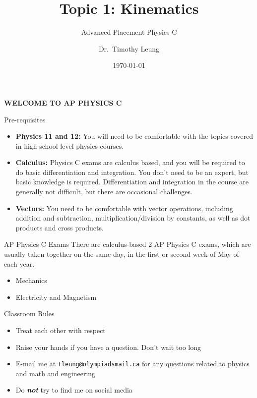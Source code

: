 \documentclass[12pt,compress,aspectratio=169]{beamer}
\title{Topic 1: Kinematics}
\subtitle{Advanced Placement Physics C}
\author[TML]{Dr.\ Timothy Leung}
\institute{Olympiads School}
\date{\today}
\begin{document}
\begin{frame}{}

  {\LARGE
    \begin{center}
      \textbf{WELCOME TO AP PHYSICS C}
    \end{center}
  }
\end{frame}



\begin{frame}{Pre-requisites}
  \begin{itemize}
  \item\textbf{Physics 11 and 12:} You will need to be comfortable with the
    topics covered in high-school level physics courses.
  \item\textbf{Calculus:} Physics C exams are calculus based, and you will be
    required to do basic differentiation and integration. You don't need to be
    an expert, but basic knowledge is required. Differentiation and integration
    in the course are generally not difficult, but there are occasional
    challenges.
  \item\textbf{Vectors:} You need to be comfortable with vector operations,
    including addition and subtraction, multiplication/division by constants,
    as well as dot products and cross products.
  \end{itemize}
\end{frame}



\begin{frame}{AP Physics C Exams}
  There are calculus-based 2 AP Physics C exams, which are usually taken
  together on the same day, in the first or second week of May of each year.
  \begin{itemize}
  \item Mechanics
  \item Electricity and Magnetism
  \end{itemize}
\end{frame}



\begin{frame}{Classroom Rules}
  \begin{itemize}
  \item Treat each other with respect
  \item Raise your hands if you have a question. Don't wait too long
  \item E-mail me at \texttt{tleung@olympiadsmail.ca} for any questions related
    to physics and math and engineering
  \item Do \textbf{\emph{not}} try to find me on social media
  \end{itemize}
\end{frame}
\end{document}
